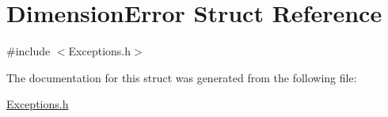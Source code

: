 \hypertarget{structDimensionError}{}\section{Dimension\+Error Struct Reference}
\label{structDimensionError}


{\ttfamily \#include $<$Exceptions.\+h$>$}



The documentation for this struct was generated from the following file\+:\begin{DoxyCompactItemize}
\item 
\hyperlink{Exceptions_8h}{Exceptions.\+h}\end{DoxyCompactItemize}
